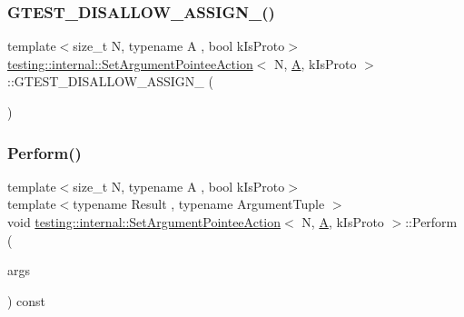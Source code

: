 \subsubsection{\texorpdfstring{G\+T\+E\+S\+T\+\_\+\+D\+I\+S\+A\+L\+L\+O\+W\+\_\+\+A\+S\+S\+I\+G\+N\+\_\+()}{GTEST\_DISALLOW\_ASSIGN\_()}}
{\footnotesize\ttfamily template$<$size\+\_\+t N, typename A , bool k\+Is\+Proto$>$ \\
\hyperlink{classtesting_1_1internal_1_1SetArgumentPointeeAction}{testing\+::internal\+::\+Set\+Argument\+Pointee\+Action}$<$ N, \hyperlink{namespacetesting_a5e9134d655d2fc9323902348083282e7}{A}, k\+Is\+Proto $>$\+::G\+T\+E\+S\+T\+\_\+\+D\+I\+S\+A\+L\+L\+O\+W\+\_\+\+A\+S\+S\+I\+G\+N\+\_\+ (\begin{DoxyParamCaption}\item[{\hyperlink{classtesting_1_1internal_1_1SetArgumentPointeeAction}{Set\+Argument\+Pointee\+Action}$<$ N, \hyperlink{namespacetesting_a5e9134d655d2fc9323902348083282e7}{A}, k\+Is\+Proto $>$}]{ }\end{DoxyParamCaption})\hspace{0.3cm}{\ttfamily [private]}}

\mbox{\label{classtesting_1_1internal_1_1SetArgumentPointeeAction_a128320dcf991ff7f1a0087dab38b4014}} 
\subsubsection{\texorpdfstring{Perform()}{Perform()}}
{\footnotesize\ttfamily template$<$size\+\_\+t N, typename A , bool k\+Is\+Proto$>$ \\
template$<$typename Result , typename Argument\+Tuple $>$ \\
void \hyperlink{classtesting_1_1internal_1_1SetArgumentPointeeAction}{testing\+::internal\+::\+Set\+Argument\+Pointee\+Action}$<$ N, \hyperlink{namespacetesting_a5e9134d655d2fc9323902348083282e7}{A}, k\+Is\+Proto $>$\+::Perform (\begin{DoxyParamCaption}\item[{const Argument\+Tuple \&}]{args }\end{DoxyParamCaption}) const\hspace{0.3cm}{\ttfamily [inline]}}



